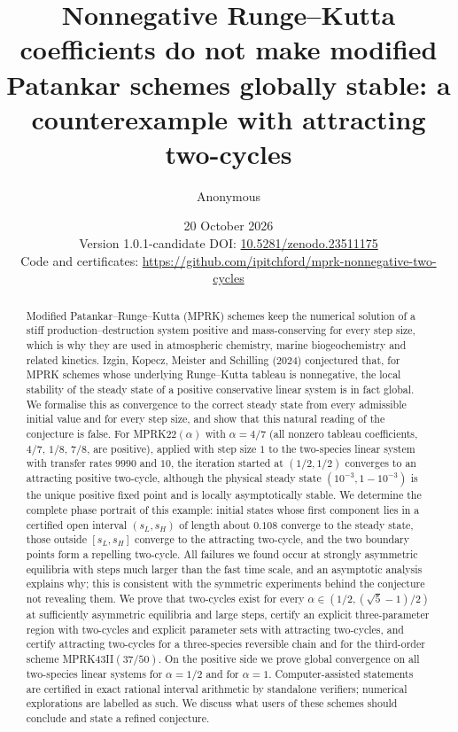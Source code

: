 \documentclass[11pt,a4paper]{article}
\title{Nonnegative Runge--Kutta coefficients do not make modified Patankar schemes globally stable: a counterexample with attracting two-cycles}
\author{Anonymous}
\date{20 October 2026\\[4pt]\small Version 1.0.1-candidate \quad DOI: \href{https://doi.org/10.5281/zenodo.23511175}{10.5281/zenodo.23511175}\\\small Code and certificates: \url{https://github.com/ipitchford/mprk-nonnegative-two-cycles}}
\theoremstyle{plain}
\theoremstyle{definition}
\begin{document}
\maketitle

\begin{abstract}
Modified Patankar--Runge--Kutta (MPRK) schemes keep the numerical solution of a stiff production--destruction system positive and mass-conserving for every step size, which is why they are used in atmospheric chemistry, marine biogeochemistry and related kinetics. Izgin, Kopecz, Meister and Schilling (2024) conjectured that, for MPRK schemes whose underlying Runge--Kutta tableau is nonnegative, the local stability of the steady state of a positive conservative linear system is in fact global. We formalise this as convergence to the correct steady state from every admissible initial value and for every step size, and show that this natural reading of the conjecture is false. For MPRK22$(\alpha)$ with $\alpha=4/7$ (all nonzero tableau coefficients, $4/7$, $1/8$, $7/8$, are positive), applied with step size $1$ to the two-species linear system with transfer rates $9990$ and $10$, the iteration started at $(1/2,1/2)$ converges to an attracting positive two-cycle, although the physical steady state $(10^{-3},1-10^{-3})$ is the unique positive fixed point and is locally asymptotically stable. We determine the complete phase portrait of this example: initial states whose first component lies in a certified open interval $(s_L,s_H)$ of length about $0.108$ converge to the steady state, those outside $[s_L,s_H]$ converge to the attracting two-cycle, and the two boundary points form a repelling two-cycle. All failures we found occur at strongly asymmetric equilibria with steps much larger than the fast time scale, and an asymptotic analysis explains why; this is consistent with the symmetric experiments behind the conjecture not revealing them. We prove that two-cycles exist for every $\alpha\in(1/2,(\sqrt5-1)/2)$ at sufficiently asymmetric equilibria and large steps, certify an explicit three-parameter region with two-cycles and explicit parameter sets with attracting two-cycles, and certify attracting two-cycles for a three-species reversible chain and for the third-order scheme MPRK43II$(37/50)$. On the positive side we prove global convergence on all two-species linear systems for $\alpha=1/2$ and for $\alpha=1$. Computer-assisted statements are certified in exact rational interval arithmetic by standalone verifiers; numerical explorations are labelled as such. We discuss what users of these schemes should conclude and state a refined conjecture.
\end{abstract}
\end{document}
